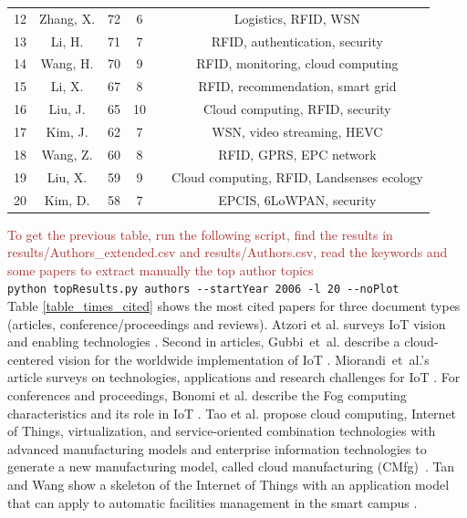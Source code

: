 \documentclass[symmetry,article,accept,moreauthors,pdftex10pt,a4paper]{mdpi}
\begin{document}
\begin{table}[H]
{\begin{tabular}{cccccc}
		12 & Zhang, X. & 72 & 6 & \cite{Yang2015161} & Logistics, RFID, WSN \\
		13 & Li, H. & 71 & 7 & \cite{Li2015} & RFID, authentication, security \\
		14 & Wang, H. & 70 & 9 & \cite{Qin2016137} & RFID, monitoring, cloud computing \\
		15 & Li, X. & 67 & 8 & \cite{Li201168} & RFID, recommendation, smart grid \\
		16 & Liu, J. & 65 & 10 & \cite{Sun20101} & Cloud computing, RFID, security \\
		17 & Kim, J. & 62 & 7 & \cite{Lim2015375} & WSN, video streaming, HEVC \\
		18 & Wang, Z. & 60 & 8 & \cite{Guo20131531} & RFID, GPRS, EPC network \\
		19 & Liu, X. & 59 & 9 & \cite{Li20131147} & Cloud computing, RFID, Landsenses ecology \\
		20 & Kim, D. & 58 & 7 & \cite{Hong201034} & EPCIS, 6LoWPAN, security \\
    	\bottomrule
	\end{tabular}}
\end{table}

\noindent
\textcolor{brown}{To get the previous table, run the following script, find the results in results/Authors\_extended.csv and results/Authors.csv, read the keywords and some papers to extract manually the top author topics}\\
\hspace*{0.5cm}\verb|python topResults.py authors --startYear 2006 -l 20 --noPlot|\\


Table \ref{table_times_cited} shows the most cited papers for three document types (articles, conference/proceedings and reviews). Atzori et al. surveys IoT vision and enabling technologies \cite{Atzori20102787}. Second in articles, Gubbi~et~al. describe a cloud-centered vision for the worldwide implementation of IoT \cite{Gubbi20131645}. Miorandi~et~al.'s article surveys on technologies, applications and research challenges for IoT \cite{Miorandi20121497}. 
For conferences and proceedings, Bonomi et al. describe the Fog computing characteristics and its role in IoT \cite{Bonomi201213}. Tao et al. propose cloud computing, Internet of Things, virtualization, and service-oriented combination technologies with advanced manufacturing models and enterprise information technologies to generate a new manufacturing model, called cloud manufacturing (CMfg)~\cite{Tao20111969}. Tan and Wang show a skeleton of the Internet of Things with an application model that can apply to automatic facilities management in the smart campus \cite{Tan2010}.
\end{document}
